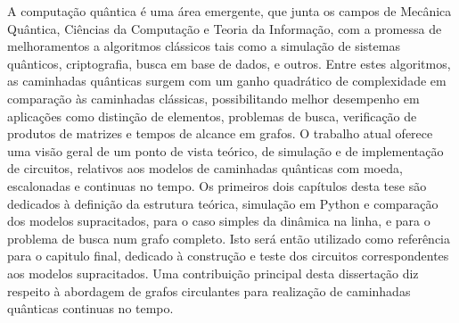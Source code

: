 \documentclass[../../dissertation.tex]{subfiles}
\begin{document}
A computação quântica é uma área emergente, que junta os campos de Mecânica
Quântica, Ciências da Computação e Teoria da Informação, com a promessa de
melhoramentos a algoritmos clássicos tais como a simulação de sistemas
quânticos, criptografia, busca em base de dados, e outros. Entre estes
algoritmos, as caminhadas quânticas surgem com um ganho quadrático de
complexidade em comparação às caminhadas clássicas, possibilitando melhor
desempenho em aplicações como distinção de elementos, problemas de busca,
verificação de produtos de matrizes e tempos de alcance em grafos. O trabalho atual
oferece uma visão geral de um ponto de vista teórico, de simulação e de
implementação de circuitos, relativos aos modelos de caminhadas quânticas com
moeda, escalonadas e continuas no tempo. Os primeiros dois capítulos desta tese
são dedicados à definição da estrutura teórica, simulação em Python e
comparação dos modelos supracitados, para o caso simples da
dinâmica na linha, e para o problema de busca num grafo completo. Isto será
então utilizado como referência para o capitulo final, dedicado à construção e teste dos circuitos correspondentes aos modelos supracitados. Uma contribuição principal desta dissertação diz respeito à abordagem de grafos circulantes para realização de caminhadas quânticas continuas no tempo.
\end{document}
